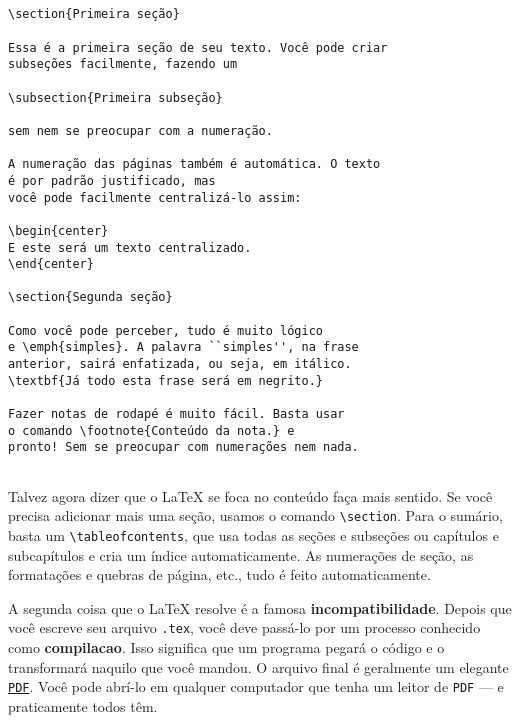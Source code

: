 {\small
\begin{verbatim}


\section{Primeira seção}

Essa é a primeira seção de seu texto. Você pode criar 
subseções facilmente, fazendo um

\subsection{Primeira subseção}

sem nem se preocupar com a numeração. 

A numeração das páginas também é automática. O texto 
é por padrão justificado, mas
você pode facilmente centralizá-lo assim:

\begin{center}
E este será um texto centralizado.
\end{center}

\section{Segunda seção}

Como você pode perceber, tudo é muito lógico 
e \emph{simples}. A palavra ``simples'', na frase 
anterior, sairá enfatizada, ou seja, em itálico. 
\textbf{Já todo esta frase será em negrito.}

Fazer notas de rodapé é muito fácil. Basta usar 
o comando \footnote{Conteúdo da nota.} e 
pronto! Sem se preocupar com numerações nem nada.


\end{verbatim}
}

Talvez agora dizer que o \LaTeX{} se foca no conteúdo faça mais sentido. Se você precisa adicionar mais uma seção, usamos o comando \verb+\section+. Para o sumário, basta um \verb+\tableofcontents+, que usa todas as seções e subseções ou capítulos e subcapítulos e cria um índice automaticamente. As numerações de seção, as formatações e quebras de página, etc., tudo é feito automaticamente.

A segunda coisa que o \LaTeX{} resolve é a famosa \textbf{incompatibilidade}. Depois que você escreve seu arquivo \texttt{.tex}, você deve passá-lo por um processo conhecido como \textbf{\gls{compilacao}}. Isso significa que um programa pegará o código e o transformará naquilo que você mandou. O arquivo final é geralmente um elegante \href{http://pt.wikipedia.org/wiki/Portable_Document_Format}{\texttt{PDF}}. Você pode abrí-lo em qualquer computador que tenha um leitor de \texttt{PDF} --- e praticamente todos têm.

